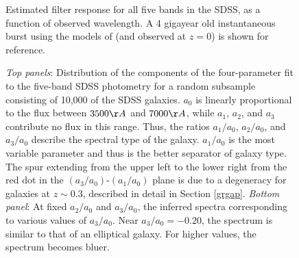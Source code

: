 \clearpage

\setcounter{thefigs}{0}

\clearpage
{}
\begin{figure}
\figurenum{\fignum}
\caption{\label{response_sdss} Estimated filter response for all five
bands in the SDSS, as a function of observed wavelength. A 4 gigayear
old instantaneous burst using the models of \citet{bruzual93a} (and
observed at $z=0$) is shown for reference.}
\end{figure}


\clearpage
{}
\begin{figure}
\figurenum{\fignum}
\caption{\label{k_coeffdist_plot} {\it Top panels}: Distribution of
the components of the four-parameter fit to the five-band SDSS
photometry for a random subsample consisting of 10,000 of the SDSS
galaxies. $a_0$ is linearly proportional to the flux between $3500\AA$
and $7000\AA$, while $a_1$, $a_2$, and $a_3$ contribute no flux in
this range. Thus, the ratios $a_1/a_0$, $a_2/a_0$, and $a_3/a_0$
describe the spectral type of the galaxy. $a_1/a_0$ is the most
variable parameter and thus is the better separator of galaxy
type. The spur extending from the upper left to the lower right from
the red dot in the $(a_3/a_0)$-$(a_1/a_0)$ plane is due to a
degeneracy for galaxies at $z\sim 0.3$, described in detail in Section
\ref{grgap}. {\it Bottom panel}: At fixed $a_2/a_0$ and $a_3/a_0$, the
inferred spectra corresponding to various values of $a_3/a_0$. Near
$a_3/a_0=-0.20$, the spectrum is similar to that of an elliptical
galaxy. For higher values, the spectrum becomes bluer. }
\end{figure}

